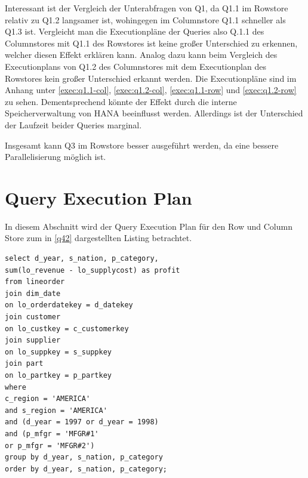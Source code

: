 Interessant ist der Vergleich der Unterabfragen von Q1, da Q1.1
im Rowstore relativ zu Q1.2 langsamer ist, wohingegen im Columnstore
Q1.1 schneller als Q1.3 ist.
Vergleicht man die Executionpläne der Queries also Q.1.1 des Columnstores mit Q1.1 des Rowstores ist keine großer Unterschied zu erkennen, welcher diesen Effekt
erklären kann.
Analog dazu kann beim Vergleich des Executionplans von Q1.2 des Columnstores
mit dem Executionplan des Rowstores kein großer Unterschied erkannt werden.
Die Executionpläne sind im Anhang unter \autoref{exec:q1.1-col},
\autoref{exec:q1.2-col}, \autoref{exec:q1.1-row} und \autoref{exec:q1.2-row}
zu sehen.
Dementsprechend könnte der Effekt durch die interne Speicherverwaltung von HANA
beeinflusst werden.
Allerdings ist der Unterschied der Laufzeit beider Queries marginal.

Insgesamt kann Q3 im Rowstore besser ausgeführt werden,
da eine bessere Parallelisierung möglich ist.

\section{Query Execution Plan}
In diesem Abschnitt wird der Query Execution Plan für den Row und Column Store zum in \autoref{q42} dargestellten Listing betrachtet. 

\begin{lstlisting}[label=q42, caption={Benchmark Query 4.2}]
select d_year, s_nation, p_category,
sum(lo_revenue - lo_supplycost) as profit
from lineorder
join dim_date
on lo_orderdatekey = d_datekey
join customer
on lo_custkey = c_customerkey
join supplier
on lo_suppkey = s_suppkey
join part
on lo_partkey = p_partkey
where
c_region = 'AMERICA'
and s_region = 'AMERICA'
and (d_year = 1997 or d_year = 1998)
and (p_mfgr = 'MFGR#1'
or p_mfgr = 'MFGR#2')
group by d_year, s_nation, p_category
order by d_year, s_nation, p_category;
\end{lstlisting}

